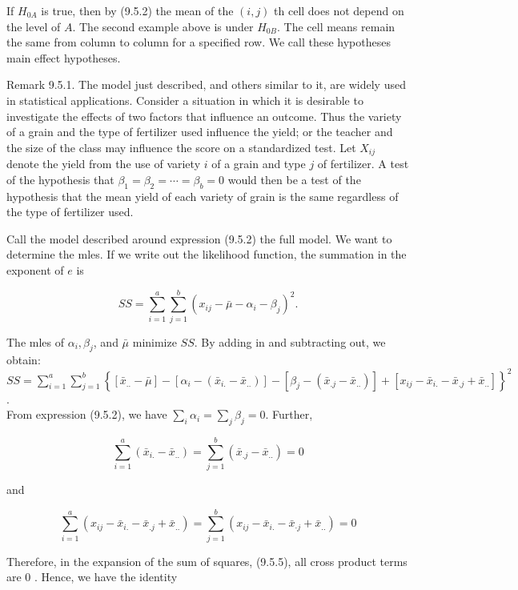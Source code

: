 If $H_{0 A}$ is true, then by (9.5.2) the mean of the $(i, j)$ th cell does not depend on the level of $A$. The second example above is under $H_{0 B}$. The cell means remain the same from column to column for a specified row. We call these hypotheses main effect hypotheses.

Remark 9.5.1. The model just described, and others similar to it, are widely used in statistical applications. Consider a situation in which it is desirable to investigate the effects of two factors that influence an outcome. Thus the variety of a grain and the type of fertilizer used influence the yield; or the teacher and the size of the class may influence the score on a standardized test. Let $X_{i j}$ denote the yield from the use of variety $i$ of a grain and type $j$ of fertilizer. A test of the hypothesis that $\beta_{1}=\beta_{2}=\cdots=\beta_{b}=0$ would then be a test of the hypothesis that the mean yield of each variety of grain is the same regardless of the type of fertilizer used.

Call the model described around expression (9.5.2) the full model. We want to determine the mles. If we write out the likelihood function, the summation in the exponent of $e$ is

$$
S S=\sum_{i=1}^{a} \sum_{j=1}^{b}\left(x_{i j}-\bar{\mu}-\alpha_{i}-\beta_{j}\right)^{2} .
$$

The mles of $\alpha_{i}, \beta_{j}$, and $\bar{\mu}$ minimize $S S$. By adding in and subtracting out, we obtain:\\
$S S=\sum_{i=1}^{a} \sum_{j=1}^{b}\left\{\left[\bar{x}_{. .}-\bar{\mu}\right]-\left[\alpha_{i}-\left(\bar{x}_{i .}-\bar{x}_{. .}\right)\right]-\left[\beta_{j}-\left(\bar{x}_{. j}-\bar{x}_{. .}\right)\right]+\left[x_{i j}-\bar{x}_{i .}-\bar{x}_{. j}+\bar{x}_{. .}\right]\right\}^{2}$.\\
From expression (9.5.2), we have $\sum_{i} \alpha_{i}=\sum_{j} \beta_{j}=0$. Further,

$$
\sum_{i=1}^{a}\left(\bar{x}_{i .}-\bar{x}_{. .}\right)=\sum_{j=1}^{b}\left(\bar{x}_{. j}-\bar{x}_{. .}\right)=0
$$

and

$$
\sum_{i=1}^{a}\left(x_{i j}-\bar{x}_{i .}-\bar{x}_{. j}+\bar{x}_{. .}\right)=\sum_{j=1}^{b}\left(x_{i j}-\bar{x}_{i .}-\bar{x}_{\cdot j}+\bar{x}_{. .}\right)=0
$$

Therefore, in the expansion of the sum of squares, (9.5.5), all cross product terms are 0 . Hence, we have the identity


